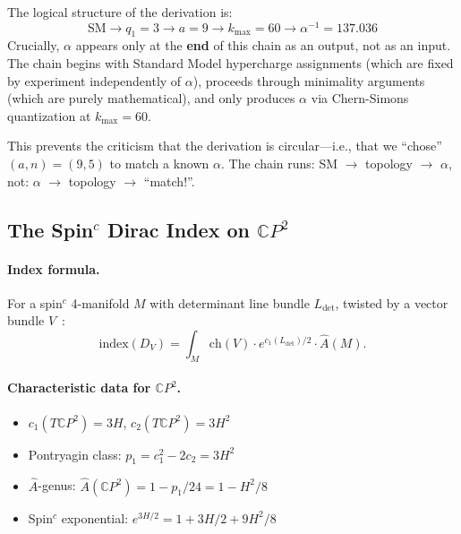 \begin{remark}\label{rem:independence}
The logical structure of the derivation is:
\begin{equation}
\text{SM} \to q_1 = 3 \to a = 9 \to k_{\max} = 60 \to \alpha^{-1} = 137.036
\end{equation}
Crucially, $\alpha$ appears only at the \textbf{end} of this chain as an output, not as an input. The chain begins with Standard Model hypercharge assignments (which are fixed by experiment independently of $\alpha$), proceeds through minimality arguments (which are purely mathematical), and only produces $\alpha$ via Chern-Simons quantization at $k_{\max} = 60$. 

This prevents the criticism that the derivation is circular---i.e., that we ``chose'' $(a,n) = (9,5)$ to match a known $\alpha$. The chain runs: SM $\to$ topology $\to$ $\alpha$, not: $\alpha$ $\to$ topology $\to$ ``match!''.
\end{remark}

\subsection{The Spin$^c$ Dirac Index on $\mathbb{C}P^2$}\label{app:index}

\paragraph{Index formula.}
For a spin$^c$ 4-manifold $M$ with determinant line bundle $L_{\det}$, twisted by a vector bundle $V$~\cite{LawsonMichelsohn1989}:
\begin{equation}
\text{index}(D_V) = \int_M \text{ch}(V) \cdot e^{c_1(L_{\det})/2} \cdot \hat{A}(M).
\end{equation}

\paragraph{Characteristic data for $\mathbb{C}P^2$.}
\begin{itemize}
\item $c_1(T\mathbb{C}P^2) = 3H$, $c_2(T\mathbb{C}P^2) = 3H^2$
\item Pontryagin class: $p_1 = c_1^2 - 2c_2 = 3H^2$
\item $\hat{A}$-genus: $\hat{A}(\mathbb{C}P^2) = 1 - p_1/24 = 1 - H^2/8$
\item Spin$^c$ exponential: $e^{3H/2} = 1 + 3H/2 + 9H^2/8$
\end{itemize}

